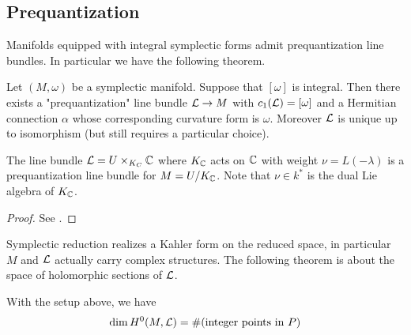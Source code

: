 \subsection{Prequantization}
Manifolds equipped with integral symplectic forms admit prequantization line bundles.
In particular we have the following theorem. 

\begin{theorem}
    Let $(M,\omega)$ be a symplectic manifold. Suppose that $[\omega]$ is integral. Then 
    there exists a "prequantization" line bundle ${\mathcal{L}} \to M$ with $c_1({\mathcal{L}}) = [\omega]$ and a Hermitian connection $\alpha$
    whose corresponding curvature form is $\omega$. Moreover ${\mathcal{L}}$ is unique up to isomorphism 
    (but still requires a particular choice). 
\end{theorem}

\begin{remark}
\end{remark}

\begin{proposition}
    The line bundle ${\mathcal{L}} = U \times_{K_C} \mathbb{C}$ where $K_{\mathbb{C}}$ acts on $\mathbb{C}$ with 
    weight $\nu = L(-\lambda)$ is a prequantization line bundle for $M = U/K_{\mathbb{C}}$. Note that $\nu \in k^*$ is the 
    dual Lie algebra of $K_{\mathbb{C}}$.
\end{proposition}
\begin{proof}
    See \cite{hamilton}.
\end{proof}
Symplectic reduction realizes a Kahler form on the reduced space, in particular
$M$ and ${\mathcal{L}}$ actually carry complex structures. The following theorem is about the space of
holomorphic sections of ${\mathcal{L}}$.
\begin{theorem}
    With the setup above, we have \begin{align*}
        \dim H^0(M,{\mathcal{L}}) = \#(\text{integer points in } P)
    \end{align*}
\end{theorem}


